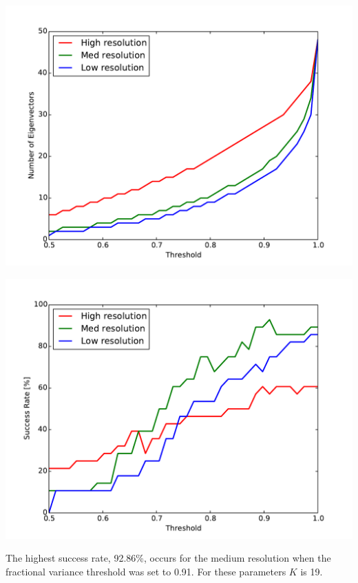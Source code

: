 \documentclass{article} %
\begin{document}
\begin{minipage}{0.5\textwidth}
	\centering
	\includegraphics[width=1.0\linewidth]{fig/neig.pdf}
	\label{fig:neig}
\end{minipage}
\hfill
\begin{minipage}{0.5\textwidth}
	\centering
	\includegraphics[width=1.0\linewidth]{fig/rate.pdf}
	\label{fig:rate}
\end{minipage}

The highest success rate, 92.86\%, occurs for the medium resolution when the fractional variance threshold was set to 0.91.  For these parameters $K$ is 19.
\end{document}
